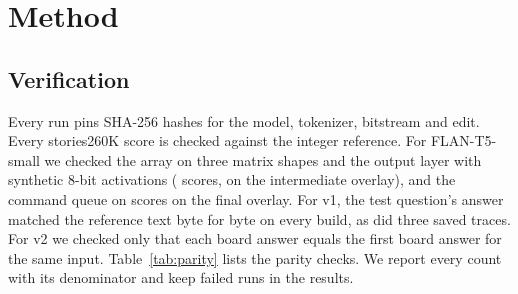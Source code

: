 \documentclass[conference,10pt,letterpaper]{IEEEtran}
\newcommand{\flan}{\mbox{FLAN-T5-small}}
\newcommand{\stories}{\mbox{stories260K}}
\newcommand{\eightbit}{\mbox{8-bit}}
\begin{document}
\section{Method}
\label{sec:method}

\subsection{Verification}
Every run pins SHA-256 hashes for the model, tokenizer, bitstream and edit. Every \stories{} score is checked against the integer reference. For \flan{} we checked the array on three matrix shapes and the output layer with synthetic \eightbit{} activations (\projectionArrayScores{} scores, on the intermediate overlay), and the command queue on \queueScores{} scores on the final overlay. For v1, the test question's answer matched the reference text byte for byte on every build, as did three saved traces. For v2 we checked only that each board answer equals the first board answer for the same input. Table~\ref{tab:parity} lists the parity checks. We report every count with its denominator and keep failed runs in the results.
\end{document}

